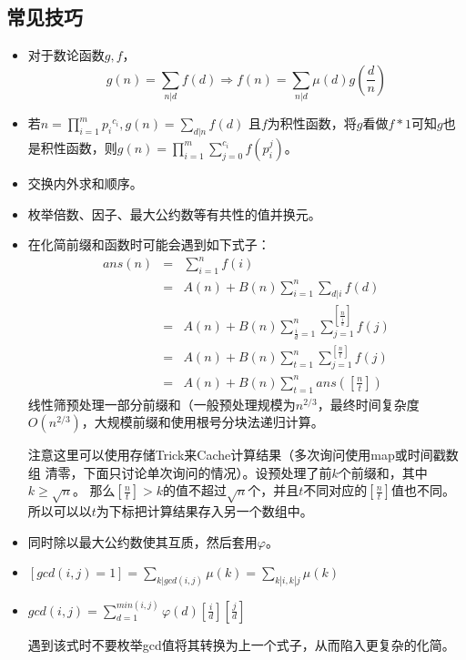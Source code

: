 \subsection{常见技巧}
\begin{itemize}
	\item
	      对于数论函数$g,f$，
	      \begin{displaymath}
		      g(n)=\sum_{n|d}{f(d)}\Rightarrow
		      f(n)=\sum_{n|d}{\mu(d)g(\frac{d}{n})}
	      \end{displaymath}
	\item
	      若$\displaystyle n=\prod_{i=1}^m{{p_i}^{c_i}},g(n)=\sum_{d|n}{f(d)}$
	      且$f$为积性函数，将$g$看做$f*1$可知$g$也是积性函数，则$\displaystyle
		      g(n)=\prod_{i=1}^m{\sum_{j=0}^{c_i}{f(p_i^j)}}$。
	\item 交换内外求和顺序。
	\item 枚举倍数、因子、最大公约数等有共性的值并换元。
	\item 在化简前缀和函数时可能会遇到如下式子：
	      \begin{eqnarray*}
		      ans(n)&=&\sum_{i=1}^n{f(i)}\\
		      &=&A(n)+B(n)\sum_{i=1}^n{\sum_{d|i}{f(d)}}\\
		      &=&A(n)+B(n)\sum_{\frac{i}{d}=1}^n{\sum_{j=1}^{\left[\frac{n}{\frac{i}{d}}\right]}{f(j)}}\\
		      &=&A(n)+B(n)\sum_{t=1}^n{\sum_{j=1}^{[\frac{n}{t}]}{f(j)}}\\
		      &=&A(n)+B(n)\sum_{t=1}^n{ans([\frac{n}{t}])}
	      \end{eqnarray*}
	      线性筛预处理一部分前缀和（一般预处理规模为$n^{2/3}$，最终时间复杂度
	      $O(n^{2/3})$，大规模前缀和使用根号分块法递归计算。

	      注意这里可以使用存储Trick来Cache计算结果（多次询问使用map或时间戳数组
	      清零，下面只讨论单次询问的情况）。设预处理了前$k$个前缀和，其中$k\geq \sqrt{n}$。
		那么$[\frac{n}{t}]>k$的值不超过$\sqrt{n}$个，并且$t$不同对应的$[\frac{n}{t}]$值也不同。
		所以可以以$t$为下标把计算结果存入另一个数组中。
	\item 同时除以最大公约数使其互质，然后套用$\varphi$。
	\item $\displaystyle [gcd(i,j)=1]=\sum_{k|gcd(i,j)}\mu(k)=\sum_{k|i,k|j}\mu(k)$
	\item $\displaystyle gcd(i,j)=\sum_{d=1}^{min(i,j)}{\varphi(d)[\frac{i}{d}][\frac{j}{d}]}$

		遇到该式时不要枚举gcd值将其转换为上一个式子，从而陷入更复杂的化简。


\end{itemize}
